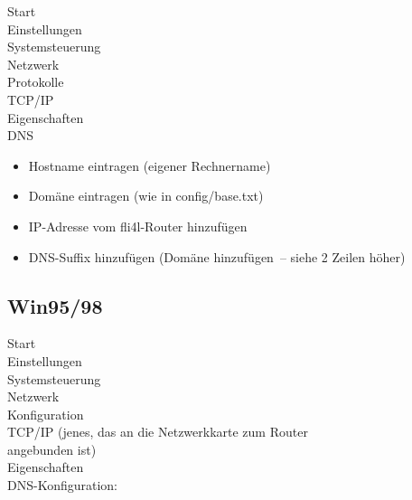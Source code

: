  Start \pfeil\\
  \hspace*{2ex}Einstellungen \pfeil\\
  \hspace*{4ex}Systemsteuerung  \pfeil\\
  \hspace*{6ex}Netzwerk \pfeil\\
  \hspace*{8ex}Protokolle \pfeil\\
  \hspace*{10ex}TCP/IP \pfeil\\
  \hspace*{12ex}Eigenschaften \pfeil\\
  \hspace*{14ex}DNS \pfeil\\
  \hspace{16ex}\begin{itemize}
  \item Hostname eintragen (eigener Rechnername)
  \item Domäne eintragen (wie in config/base.txt)
  \item IP-Adresse vom fli4l-Router hinzufügen
  \item DNS-Suffix hinzufügen (Domäne hinzufügen~-- siehe
    2 Zeilen höher)
  \end{itemize}

\subsection{Win95/98}

  Start \pfeil\\
  \hspace*{2ex}Einstellungen \pfeil\\
  \hspace*{4ex}Systemsteuerung \pfeil\\
  \hspace*{6ex}Netzwerk \pfeil\\
  \hspace*{8ex}Konfiguration \pfeil\\
  \hspace*{10ex}TCP/IP (jenes, das an die Netzwerkkarte zum Router\\
  \hspace*{10ex}angebunden ist) \pfeil\\
  \hspace*{12ex}Eigenschaften \pfeil\\
  \hspace*{14ex}DNS-Konfiguration:

